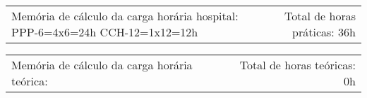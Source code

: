 {\fontsize{10pt}{12pt}\selectfont
\noindent
\begin{tabularx}{\linewidth}{@{}X r@{}}
Memória de cálculo da carga horária hospital:
PPP-6=4x6=24h
CCH-12=1x12=12h&
Total de horas práticas: 36h\\
\end{tabularx}
\noindent
\begin{tabularx}{\linewidth}{@{}X r@{}}
Memória de cálculo da carga horária teórica: 
 &
Total de horas teóricas: 0h
\end{tabularx}
}